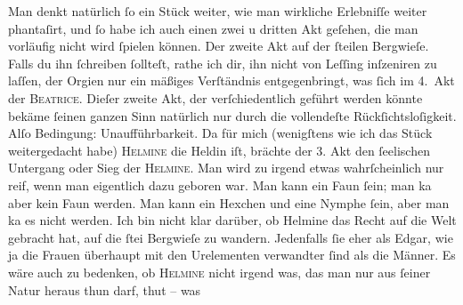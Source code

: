 \pstart
           Man denkt natürlich ſo ein Stück weiter, wie man wirkliche Erlebniſſe weiter
               phantaſirt, und ſo habe ich auch einen zwei u dritten Akt geſehen, die man vorläufig nicht wird ſpielen können. Der
               zweite Akt auf der ſteilen Bergwieſe. Falls du ihn ſchreiben ſollteſt, rathe ich dir,
               ihn nicht von Leſſing inſzeniren zu laſſen,
               der Orgien nur ein mäßiges Verſtändnis entgegenbringt, was {\pb}ſich im 4. Akt der \textsc{Beatrice}\label{K_L01604-1v}\label{K_L01604-1}. Dieſer
               zweite Akt, der verſchiedentlich geführt werden könnte bekäme ſeinen ganzen Sinn
               natürlich nur durch die vollendeſte Rückſichtsloſigkeit. Alſo Bedingung:
               Unaufführbarkeit. Da für mich (wenigſtens wie ich das Stück weitergedacht habe) \textsc{Helmine} die Heldin iſt, brächte der 3. Akt den ſeelischen Untergang oder Sieg der \textsc{Helmine}. Man wird zu irgend etwas wahrſcheinlich nur reif, wenn man eigentlich dazu
               geboren war. Man kann ein Faun ſein; man ka{\geminationn}{ }{\pb}aber kein Faun werden.
               Man kann ein Hexchen und eine Nymphe ſein, aber man ka{\geminationn}
               es nicht werden. Ich bin nicht klar darüber, ob Helmine das Recht auf die Welt gebracht hat, auf die
                  ſtei Bergwieſe zu wandern. Jedenfalls ſie eher als Edgar, wie ja die Frauen
               überhaupt mit den Urelementen verwandter ſind als die Männer. Es wäre auch zu
               bedenken, ob \textsc{Helmine} nicht irgend was, das man nur aus {\pb}ſeiner Natur heraus
               thun darf, \label{K_L01604-2v}\label{K_L01604-2} thut – was
